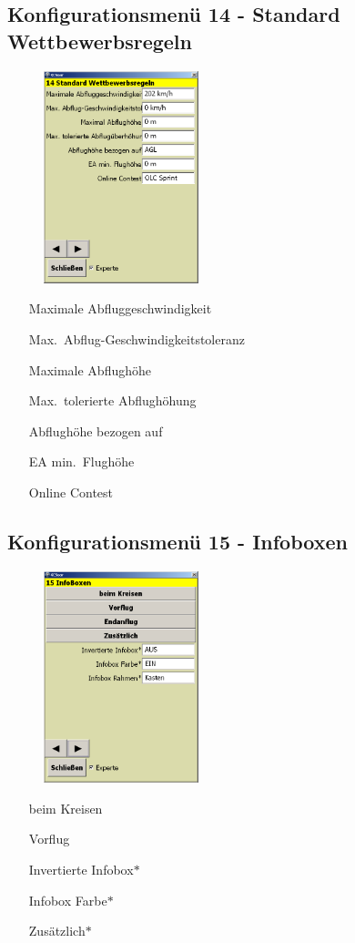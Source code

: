\subsection{Konfigurationsmenü 14 - Standard Wettbewerbsregeln}\label{Konfig14}
\begin{figure}
\includegraphics[width=4.5cm]{Bilder/Konfig14Wettbewerb.png}
\end{figure}
\begin{enumerate}
\item[Maximale Abfluggeschwindigkeit]
\item[Max.\ Abflug-Geschwindigkeitstoleranz]
\item[Maximale Abflughöhe]
\item[Max.\  tolerierte Abflughöhung ]
\item[Abflughöhe bezogen auf]
\item[EA min.\ Flughöhe]
\item[Online Contest]
\end{enumerate}

\subsection{Konfigurationsmenü 15 - Infoboxen}\label{Konfig15}
\begin{figure}
\includegraphics[width=4.5cm]{Bilder/Konfig15Infoboxen.png}
\end{figure}
\begin{enumerate}
\item[beim Kreisen]
\item[Vorflug]
\item[Invertierte Infobox$\ast$]
\item[Infobox Farbe$\ast$]
\item[Zusätzlich$\ast$]
\end{enumerate}

